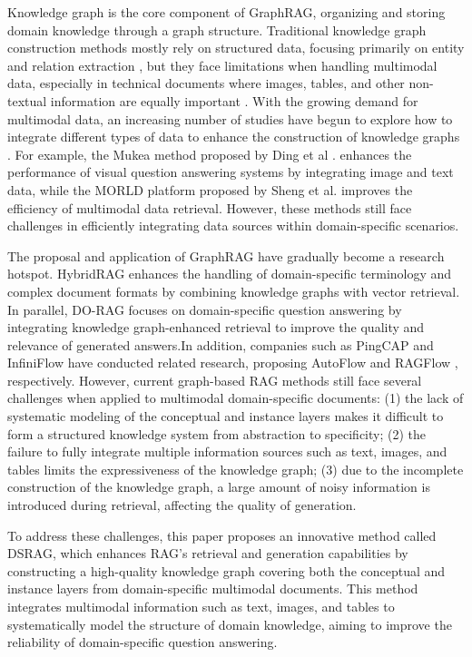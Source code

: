 \documentclass[runningheads]{llncs}
\begin{document}
	Knowledge graph is the core component of GraphRAG, organizing and storing domain knowledge through a graph structure. Traditional knowledge graph construction methods mostly rely on structured data, focusing primarily on entity and relation extraction \cite{suchanek2007yago}, but they face limitations when handling multimodal data, especially in technical documents where images, tables, and other non-textual information are equally important \cite{xu2020layoutlm}. With the growing demand for multimodal data, an increasing number of studies have begun to explore how to integrate different types of data to enhance the construction of knowledge graphs \cite{zhu2022multi}. For example, the Mukea method \cite{ding2022mukea} proposed by Ding et al . enhances the performance of visual question answering systems by integrating image and text data, while the MORLD platform \cite{sheng2025mqrld} proposed by Sheng et al. improves the efficiency of multimodal data retrieval. However, these methods still face challenges in efficiently integrating data sources within domain-specific scenarios.
	
	The proposal and application of GraphRAG have gradually become a research hotspot. HybridRAG \cite{sarmah2024hybridrag} enhances the handling of domain-specific terminology and complex document formats by combining knowledge graphs with vector retrieval. In parallel, DO-RAG \cite{opoku2025dorag} focuses on domain-specific question answering by integrating knowledge graph-enhanced retrieval to improve the quality and relevance of generated answers.In addition, companies such as PingCAP and InfiniFlow have conducted related research, proposing AutoFlow \cite{pingcap_tidb_autoflow_2023} and RAGFlow \cite{infiniflow_ragflow_2024}, respectively. However, current graph-based RAG methods still face several challenges when applied to multimodal domain-specific documents: (1) the lack of systematic modeling of the conceptual and instance layers makes it difficult to form a structured knowledge system from abstraction to specificity; (2) the failure to fully integrate multiple information sources such as text, images, and tables limits the expressiveness of the knowledge graph; (3) due to the incomplete construction of the knowledge graph, a large amount of noisy information is introduced during retrieval, affecting the quality of generation.
	
	To address these challenges, this paper proposes an innovative method called DSRAG, which enhances RAG's retrieval and generation capabilities by constructing a high-quality knowledge graph covering both the conceptual and instance layers from domain-specific multimodal documents. This method integrates multimodal information such as text, images, and tables to systematically model the structure of domain knowledge, aiming to improve the reliability of domain-specific question answering.
\end{document}
